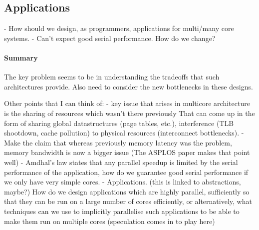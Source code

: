 \subsection{Applications}
- How should we design, as programmers, applications for multi/many core systems.
- Can't expect good serial performance. How do we change? 

\paragraph{Summary}
The key problem seems to be in understanding the tradeoffs that such architectures
provide. Also need to consider the new bottlenecks in these designs.


Other points that I can think of:
- key issue that arises in multicore architecture
is the sharing of resources which wasn't there previously
That can come up in the form of sharing global datastructures
(page tables, etc.), interference (TLB shootdown, cache pollution)
to physical resources (interconnect bottlenecks).
- Make the claim that whereas previously memory latency was the
problem, memory bandwidth is now a bigger issue (The ASPLOS
paper makes that point well)
- Amdhal's law states that any parallel speedup is limited by
the serial performance of the application, how do we guarantee
good serial performance if we only have very simple cores.
- Applications. (this is linked to abstractions, maybe?) How do
we design applications which are highly parallel, sufficiently
so that they can be run on a large number of cores efficiently,
or alternatively, what techniques can we use to
implicitly parallelise such applications to be able to make them
run on multiple cores (speculation comes in to play here)